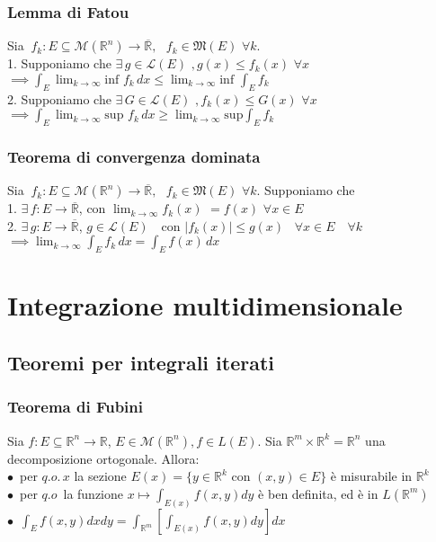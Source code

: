 \documentclass{article} %
\begin{document}
    \subsubsection*{Lemma di Fatou}
    Sia $ \ f_k: E \subseteq \mathcal{M} (\mathbb{R} ^n) \to \overline{\mathbb{R}} , \,\,\,\, f_k \in \mathfrak{M} (E) \,\, \forall k$. \\ 1. Supponiamo che $\exists \, g \in \mathcal{L} (E) \,\, , g(x) \leq f_k(x) \,\, \forall x $
    $ \implies \int_{E}^{}   \lim_{k \to \infty} \text{inf }f_k \,dx  \leq  \lim_{k \to \infty} \text{inf }\int_{E}^{}f_k$ \\
    2. Supponiamo che $\exists \, G \in \mathcal{L} (E) \,\, , f_k(x) \leq G(x) \,\, \forall x $
    $ \implies \int_{E}^{}   \lim_{k \to \infty} \text{sup }f_k \,dx  \geq  \lim_{k \to \infty} \text{sup} \int_{E}^{}f_k$
  

    \subsubsection*{Teorema di convergenza dominata}
    Sia $ \ f_k: E \subseteq \mathcal{M} (\mathbb{R} ^n) \to \overline{\mathbb{R}} , \,\,\,\, f_k \in \mathfrak{M} (E) \,\, \forall k$. Supponiamo che \\ 1. $\exists \, f: E \to \overline{\mathbb{R}} $, con $\lim_{k \to \infty} f_k(x) $ $= f(x)$ $\forall x \in E$ \\ 2. $\exists \, g: E \to \overline{\mathbb{R}} $, $g \in \mathcal{L} (E)$ \,\, con $|f_k(x)| \leq g(x) \,\,\,\,\, \forall x \in E \,\,\,\,\,\, \forall k$
    $ \implies \lim_{k \to \infty} \int_{E}^{}f_k \,dx = \int_{E}^{}f(x) \,dx $
  

    \section{Integrazione multidimensionale}

    \subsection{Teoremi per integrali iterati}
    
    \subsubsection*{Teorema di Fubini}
    Sia $f:E \subseteq \mathbb{R}^n \to \mathbb{R}$, $E \in \mathcal{M}(\mathbb{R}^n), f \in L(E)$. Sia $\mathbb{R}^m \times \mathbb{R}^k = \mathbb{R}^n$ una decomposizione ortogonale. Allora: \\
    $\bullet \,$ per $q.o. \, x$ la sezione $E(x) = \{y \in \mathbb{R}^k$ con $(x,y) \in E \}$ è misurabile in $\mathbb{R}^k$ \\
    $\bullet \,$ per $q.o \, $ la funzione $x \mapsto \int_{E(x)} f(x,y)dy$ è ben definita, ed è in $L(\mathbb{R}^m)$ \\
    $\bullet \,$ $\int_E f(x,y) dx dy = \int_{\mathbb{R}^m} \left[\int_{E(x)} f(x,y) dy\right] dx$
  
\end{document}
